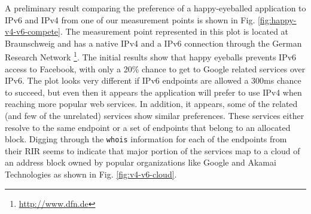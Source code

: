 A preliminary result comparing the preference of a happy-eyeballed application
to IPv6 and IPv4 from one of our measurement points is shown in Fig.
\ref{fig:happy-v4-v6-compete}. The measurement point represented in this plot
is located at Braunschweig and has a native IPv4 and a IPv6 connection through
the German Research Network \footnote{\url{http://www.dfn.de}}. The initial
results show that happy eyeballs prevents IPv6 access to Facebook, with only a
20\% chance to get to Google related services over IPv6. The plot looks very
different if IPv6 endpoints are allowed a 300ms chance to succeed, but even
then it appears the application will prefer to use IPv4 when reaching more
popular web services. In addition, it appears, some of the related (and few of
the unrelated) services show similar preferences. These services either
resolve to the same endpoint or a set of endpoints that belong to an allocated
block.  Digging through the \texttt{whois} information for each of the
endpoints from their \ac{RIR} seems to indicate that major portion of the
services map to a cloud of an address block owned by popular organizations
like Google and Akamai Technologies as shown in Fig.  \ref{fig:v4-v6-cloud}.


